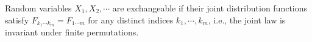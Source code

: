 Random variables $X_1, X_2, \cdots$ are exchangeable if their joint distribution functions satisfy $F_{k_1 \cdots k_m} = F_{1 \cdots m}$ for any distinct indices $k_1, \cdots, k_m$, i.e., the joint law is invariant under finite permutations.
